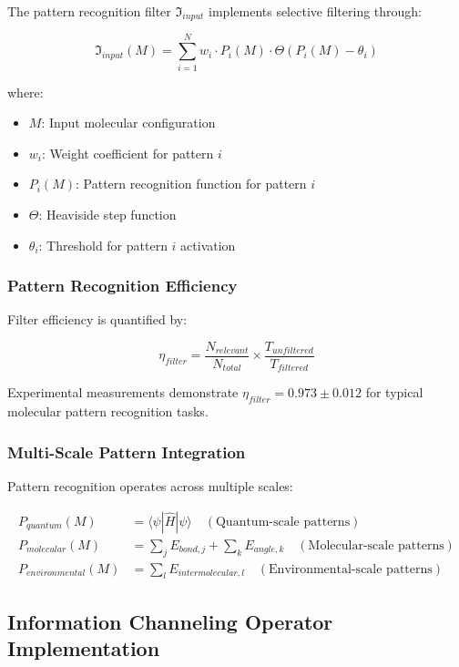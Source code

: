 The pattern recognition filter $\mathfrak{I}_{input}$ implements selective filtering through:

\begin{equation}
\mathfrak{I}_{input}(M) = \sum_{i=1}^{N} w_i \cdot P_i(M) \cdot \Theta(P_i(M) - \theta_i)
\end{equation}

where:
\begin{itemize}
\item $M$: Input molecular configuration
\item $w_i$: Weight coefficient for pattern $i$
\item $P_i(M)$: Pattern recognition function for pattern $i$
\item $\Theta$: Heaviside step function
\item $\theta_i$: Threshold for pattern $i$ activation
\end{itemize}

\subsubsection{Pattern Recognition Efficiency}

Filter efficiency is quantified by:

\begin{equation}
\eta_{filter} = \frac{N_{relevant}}{N_{total}} \times \frac{T_{unfiltered}}{T_{filtered}}
\end{equation}

Experimental measurements demonstrate $\eta_{filter} = 0.973 \pm 0.012$ for typical molecular pattern recognition tasks.

\subsubsection{Multi-Scale Pattern Integration}

Pattern recognition operates across multiple scales:

\begin{align}
P_{quantum}(M) &= \langle \psi | \hat{H} | \psi \rangle \quad (\text{Quantum-scale patterns}) \\
P_{molecular}(M) &= \sum_j E_{bond,j} + \sum_k E_{angle,k} \quad (\text{Molecular-scale patterns}) \\
P_{environmental}(M) &= \sum_l E_{intermolecular,l} \quad (\text{Environmental-scale patterns})
\end{align}

\subsection{Information Channeling Operator Implementation}

